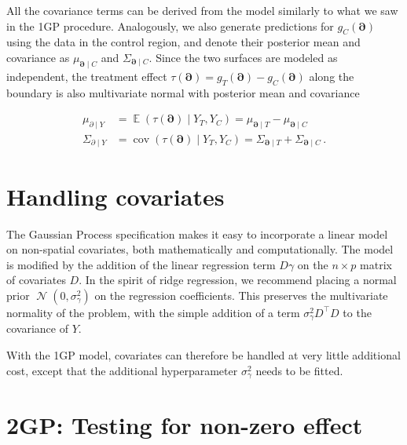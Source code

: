 \documentclass[letter]{article}
\newcommand{\genericdel}[3]{%
      \left#1#3\right#2
    }
\newcommand{\del}[1]{\genericdel(){#1}}
\DeclareMathOperator{\E}{\mathbb{E}}
\DeclareMathOperator{\cov}{{cov}}
\DeclareMathOperator{\normal}{\mathcal{N}}
\newcommand{\trans}{^{\intercal}}
\newcommand{\sigmagamma}{\sigma_{\gamma}}
\newcommand{\boundary}{\partial}
\newcommand{\sentinels}{\bm{\boundary}}
\begin{document}
All the covariance terms can be derived from the model similarly to what
we saw in the 1GP procedure. Analogously, we also generate predictions
for \(g_C(\sentinels)\) using the data in the control region, and denote
their posterior mean and covariance as \(\mu_{\sentinels \mid C}\) and
\(\Sigma_{\sentinels \mid C}\). Since the two surfaces are modeled as
independent, the treatment effect
\(\tau(\sentinels)=g_T(\sentinels)-g_C(\sentinels)\) along the boundary
is also multivariate normal with posterior mean and covariance

\begin{align}
    \mu_{\boundary \mid Y} &= \E \del{\tau(\sentinels) \mid Y_T, Y_C} = \mu_{\sentinels \mid T} - \mu_{\sentinels \mid C} \\
    \Sigma_{\boundary \mid Y} &= \cov\del{\tau(\sentinels) \mid Y_T, Y_C} = \Sigma_{\sentinels \mid T} + \Sigma_{\sentinels \mid C}\label{eq:postvar2gp}\,.
\end{align}
    


    	\section{Handling covariates}\label{handling-covariates}

The Gaussian Process specification makes it easy to incorporate a linear
model on non-spatial covariates, both mathematically and
computationally. The model is modified by the addition of the linear
regression term \(D \gamma\) on the \(n \times p\) matrix of covariates
\(D\). In the spirit of ridge regression, we recommend placing a normal
prior \(\normal(0,\sigmagamma^2)\) on the regression coefficients. This
preserves the multivariate normality of the problem, with the simple
addition of a term \(\sigmagamma^2 D\trans D\) to the covariance of
\(Y\).

With the 1GP model, covariates can therefore be handled at very little
additional cost, except that the additional hyperparameter
\(\sigmagamma^2\) needs to be fitted.
    


    	\section{2GP: Testing for non-zero
effect}\label{gp-testing-for-non-zero-effect}
\end{document}
